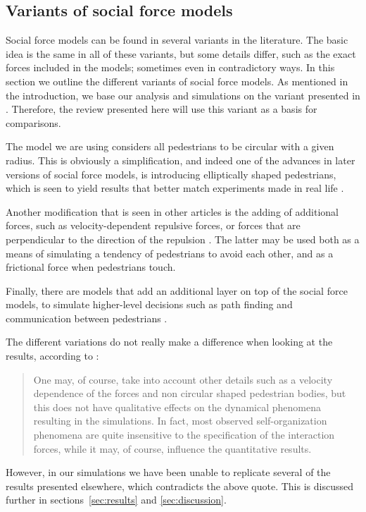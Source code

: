 \subsection{Variants of social force models}
Social force models can be found in several variants in the literature. The 
basic idea is the same in all of these variants, but some details differ, such 
as the exact forces included in the models; sometimes even in contradictory 
ways. In this section we outline the different variants of social force 
models. As mentioned in the introduction, we base our analysis and simulations 
on the variant presented in \cite{self-org}. Therefore, the review presented 
here will use this variant as a basis for comparisons.

The model we are using considers all pedestrians to be circular with a given 
radius. This is obviously a simplification, and indeed one of the advances in 
later versions of social force models, is introducing elliptically shaped 
pedestrians, which is seen to yield results that better match experiments made 
in real life \cite{ABconstant}.

Another modification that is seen in other articles is the adding of 
additional forces, such as velocity-dependent repulsive forces, or forces that 
are perpendicular to the direction of the repulsion 
\cite{helbing00,ABconstant}. The latter may be used 
both as a means of simulating a tendency of pedestrians to avoid each other, 
and as a frictional force when pedestrians touch.

Finally, there are models that add an additional layer on top of the social 
force models, to simulate higher-level decisions such as path finding and 
communication between pedestrians \cite{HiDAC}.


The different variations do not really make a difference when looking at the 
results, according to \cite{self-org}:

\begin{quote}
    One may, of course, take into account other details such as a velocity 
    dependence of the forces and non circular shaped pedestrian bodies, but 
    this does not have qualitative effects on the dynamical phenomena 
    resulting in the simulations. In fact, most observed self-organization 
    phenomena are quite insensitive to the specification of the interaction 
    forces, while it may, of course, influence the quantitative results.
\end{quote}

However, in our simulations we have been unable to replicate several of the 
results presented elsewhere, which contradicts the above quote. This is 
discussed further in sections~\ref{sec:results} and \ref{sec:discussion}.


